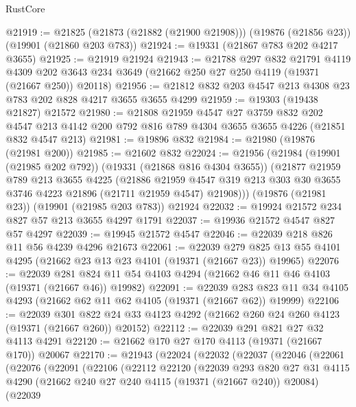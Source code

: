 \begin{lexlean}{RustCore}
\begin{coremodule}
@21919 := @21825 (@21873 (@21882 (@21900 @21908))) (@19876 (@21856 @23)) (@19901 (@21860 @203 @783))
@21924 := @19331 (@21867 @783 @202 @4217 @3655)
@21925 := @21919 @21924
@21943 := @21788
    @297
    @832
    @21791
    @4119
    @4309
    @202
    @3643
    @234
    @3649
    (@21662 @250 @27 @250 @4119 (@19371 (@21667 @250)) @20118)
@21956 := @21812 @832 @203 @4547 @213 @4308 @23 @783 @202 @828 @4217 @3655 @3655 @4299
@21959 := @19303 (@19438 @21827) @21572
@21980 := @21808
    @21959
    @4547
    @27
    @3759
    @832
    @202
    @4547
    @213
    @4142
    @200
    @792
    @816
    @789
    @4304
    @3655
    @3655
    @4226
    (@21851 @832 @4547 @213)
@21981 := @19896 @832
@21984 := @21980 (@19876 (@21981 @200))
@21985 := @21602 @832
@22024 := @21956
    (@21984
      (@19901 (@21985 @202 @792))
      (@19331 (@21868 @816 @4304 @3655))
      (@21877
        @21959
        @789
        @213
        @3655
        @4225
        (@21886
          @21959
          @4547
          @319
          @213
          @303
          @30
          @3655
          @3746
          @4223
          @21896
          (@21711 @21959 @4547)
          @21908)))
    (@19876 (@21981 @23))
    (@19901 (@21985 @203 @783))
    @21924
@22032 := @19924 @21572 @234 @827 @57 @213 @3655 @4297 @1791
@22037 := @19936 @21572 @4547 @827 @57 @4297
@22039 := @19945 @21572 @4547
@22046 := @22039 @218 @826 @11 @56 @4239 @4296 @21673
@22061 := @22039
    @279
    @825
    @13
    @55
    @4101
    @4295
    (@21662 @23 @13 @23 @4101 (@19371 (@21667 @23)) @19965)
@22076 := @22039
    @281
    @824
    @11
    @54
    @4103
    @4294
    (@21662 @46 @11 @46 @4103 (@19371 (@21667 @46)) @19982)
@22091 := @22039
    @283
    @823
    @11
    @34
    @4105
    @4293
    (@21662 @62 @11 @62 @4105 (@19371 (@21667 @62)) @19999)
@22106 := @22039
    @301
    @822
    @24
    @33
    @4123
    @4292
    (@21662 @260 @24 @260 @4123 (@19371 (@21667 @260)) @20152)
@22112 := @22039 @291 @821 @27 @32 @4113 @4291
@22120 := @21662 @170 @27 @170 @4113 (@19371 (@21667 @170)) @20067
@22170 := @21943
    (@22024
      (@22032
        (@22037
          (@22046
            (@22061
              (@22076
                (@22091
                  (@22106
                    (@22112
                      @22120
                      (@22039
                        @293
                        @820
                        @27
                        @31
                        @4115
                        @4290
                        (@21662 @240 @27 @240 @4115 (@19371 (@21667 @240)) @20084)
                        (@22039

\end{coremodule}
\end{lexlean}
